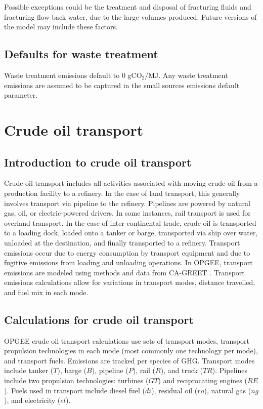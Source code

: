 \documentclass[11pt]{report}
\begin{document}
Possible exceptions could be the treatment and disposal of fracturing fluids and fracturing flow-back water, due to the large volumes produced. Future versions of the model may include these factors.

\subsection{Defaults for waste treatment}

Waste treatment emissions default to 0 gCO$_2$/MJ. Any waste treatment emissions are assumed to be captured in the small sources emissions default parameter. 



\clearpage

\section{Crude oil transport}
 \label{sec:transport}

\subsection{Introduction to crude oil transport}

Crude oil transport includes all activities associated with moving crude oil from a production facility to a refinery. In the case of land transport, this generally involves transport via pipeline to the refinery. Pipelines are powered by natural gas, oil, or electric-powered drivers. In some instances, rail transport is used for overland transport. In the case of inter-continental trade, crude oil is transported to a loading dock, loaded onto a tanker or barge, transported via ship over water, unloaded at the destination, and finally transported to a refinery.
Transport emissions occur due to energy consumption by transport equipment and due to fugitive emissions from loading and unloading operations. In OPGEE, transport emissions are modeled using methods and data from CA-GREET \cite{Wang2009}. Transport emissions calculations allow for variations in transport modes, distance travelled, and fuel mix in each mode. 


\subsection{Calculations for crude oil transport}

OPGEE crude oil transport calculations use sets of transport modes, transport propulsion technologies in each mode (most commonly one technology per mode), and transport fuels. Emissions are tracked per species of GHG. Transport modes include tanker ($T$), barge ($B$), pipeline ($P$), rail ($R$), and truck ($TR$). Pipelines include two propulsion technologies: turbines ($GT$) and reciprocating engines ($RE$). Fuels used in transport include diesel fuel ($di$), residual oil ($ro$), natural gas ($ng$), and electricity ($el$). 
\end{document}
